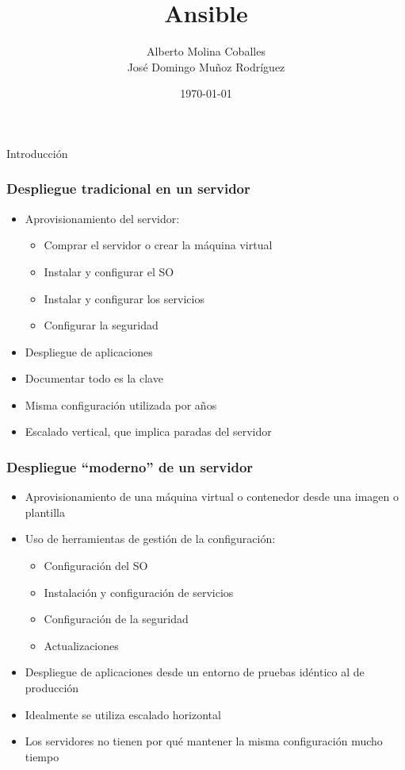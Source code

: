 \documentclass[aspectratio=169]{beamer}
\author{Alberto Molina Coballes\\
José Domingo Muñoz Rodríguez}
\title{Ansible}
\institute{IES Gonzalo Nazareno}
\date{\today}
\begin{document}
\def\braces#1{[#1]}

\begin{frame}[t,plain]
\titlepage
\end{frame}

\begin{frame}
  \begin{Large}
  \begin{center}
    Introducción    
  \end{center}    
  \end{Large}
\end{frame}

\begin{frame}
  \frametitle{Despliegue tradicional en un servidor}
  \begin{itemize}
  \item Aprovisionamiento del servidor:
    \begin{itemize}
    \item Comprar el servidor o crear la máquina virtual
    \item Instalar y configurar el SO
    \item Instalar y configurar los servicios
    \item Configurar la seguridad
    \end{itemize}
  \item Despliegue de aplicaciones
  \item Documentar todo es la clave
  \item Misma configuración utilizada por años
  \item Escalado vertical, que implica paradas del servidor
  \end{itemize}
\end{frame}

\begin{frame}
  \frametitle{Despliegue ``moderno'' de un servidor}
  \begin{itemize}
  \item Aprovisionamiento de una máquina virtual o contenedor desde una imagen o plantilla
  \item Uso de herramientas de gestión de la configuración:
    \begin{itemize}
    \item Configuración del SO
    \item Instalación y configuración de servicios
    \item Configuración de la seguridad
    \item Actualizaciones
    \end{itemize}
  \item Despliegue de aplicaciones desde un entorno de pruebas idéntico al de producción
  \item Idealmente se utiliza escalado horizontal
  \item Los servidores no tienen por qué mantener la misma configuración mucho tiempo
  \end{itemize}
\end{frame}
\end{document}
